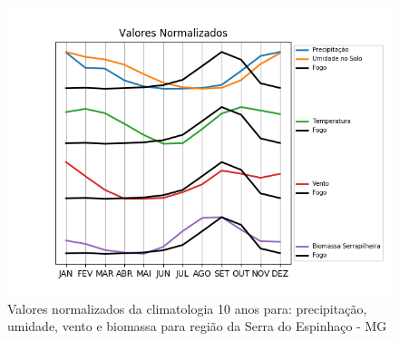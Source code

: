 \documentclass[conference]{IEEEtran}
\begin{document}
\begin{figure}[htbp]
\centerline{\includegraphics[width=0.44\paperwidth]{figuras/norm.png}}
\caption{Valores normalizados da climatologia 10 anos para: precipitação, umidade, vento e biomassa para região da Serra do Espinhaço - MG}
\label{inputNorm}
\end{figure}
\end{document}
